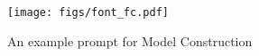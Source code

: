 \begin{figure}[h!]
    \centering
    \texttt{[image: figs/font\_fc.pdf]}
    \caption{An example prompt 
    for Model Construction
    }
    \label{fig:model_construction}
\end{figure}
